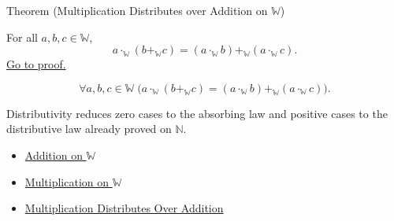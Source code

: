 \begin{theorembox}{Theorem (Multiplication Distributes over Addition on \texorpdfstring{$\mathbb{W}$}{W})}
\begin{theorem}
\label{thm:multiplication-distributes-over-addition-on-w}
For all $a,b,c\in\mathbb{W}$,
\[
a\cdot_{\mathbb{W}}(b+_{\mathbb{W}}c)
=
(a\cdot_{\mathbb{W}}b)+_{\mathbb{W}}(a\cdot_{\mathbb{W}}c).
\]
\hyperref[prf:multiplication-distributes-over-addition-on-w]{Go to proof.}
\end{theorem}
\end{theorembox}

\begin{remark*}
\[
\forall a,b,c\in\mathbb{W}\;
\bigl(a\cdot_{\mathbb{W}}(b+_{\mathbb{W}}c)
=(a\cdot_{\mathbb{W}}b)+_{\mathbb{W}}(a\cdot_{\mathbb{W}}c)\bigr).
\]
\end{remark*}

\begin{remark*}[Interpretation]
Distributivity reduces zero cases to the absorbing law and positive cases to
the distributive law already proved on $\mathbb{N}$.
\end{remark*}

\begin{dependencies}
\begin{itemize}
  \item \hyperref[def:addition-on-w]{Addition on $\mathbb{W}$}
  \item \hyperref[def:multiplication-on-w]{Multiplication on $\mathbb{W}$}
  \item \hyperref[thm:multiplication-distributes-over-addition]{Multiplication Distributes Over Addition}
\end{itemize}
\end{dependencies}
